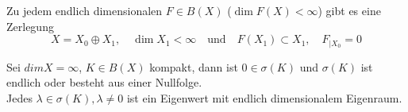 \begin{lemma} \label{lemma:14.2}
	Zu jedem endlich dimensionalen $F \in B(X)$ ($\dim F(X) < \infty$) gibt es eine Zerlegung
		\[ X = X_{0} \oplus X_{1}, \quad \dim X_{1} < \infty \quad \text{und} \quad F(X_{1}) \subset X_{1}, \quad F_{\big| X_{0}} = 0 \]
\end{lemma}



\begin{satz}  \label{satz:14.3}
	Sei $dim X = \infty$, $K \in B(X)$ kompakt, dann ist $0 \in \sigma(K)$ und $\sigma(K)$ ist endlich oder besteht aus einer Nullfolge. \\
	Jedes $\lambda \in \sigma(K), \lambda \neq 0$ ist ein Eigenwert mit endlich dimensionalem Eigenraum.
\end{satz}

